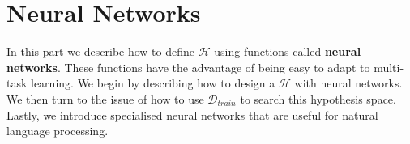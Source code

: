 \chapter{Neural Networks}
\label{neural_networks}

In this part we describe how to define $\mathcal{H}$ using functions called \textbf{neural networks}. These functions have the advantage of being easy to adapt to multi-task learning. We begin by describing how to design a $\mathcal{H}$ with neural networks. We then turn to the issue of how to use $\mathcal{D}_{train}$ to search this hypothesis space. Lastly, we introduce specialised neural networks that are useful for natural language processing.





